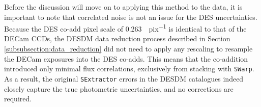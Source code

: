 Before the discussion will move on to applying this method to the data, it is important to note that correlated noise is not an issue for the DES uncertainties. Because the DES co-add pixel scale of  \SI{0.263}{\arcsec.pix^{-1}} is identical to that of the DECam CCDs, the DESDM data reduction process described in Section \ref{subsubsection:data_reduction} did not need to apply any rescaling to resample the DECam exposures into the DES co-adds. This means that the co-addition introduced only minimal flux correlations, exclusively from stacking with \texttt{SWarp}. As a result, the original \texttt{SExtractor} errors in the DESDM catalogues indeed closely capture the true photometric uncertainties, and no corrections are required. \par




